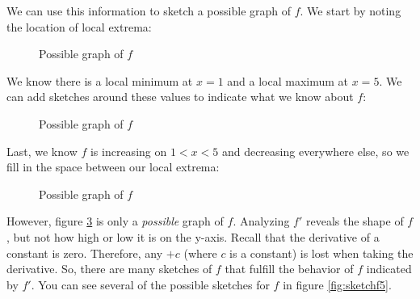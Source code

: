 We can use this information to sketch a possible graph of $f$. We start by noting the location of local extrema:
\begin{figure}[htbp]
	\centering
	\caption{Possible graph of $f$}
	\label{fig:sketchf2}
\end{figure}

We know there is a local minimum at $x=1$ and a local maximum at $x=5$. We can add sketches around these values to indicate what we know about $f$:
\begin{figure}[htbp]
	\centering
	\caption{Possible graph of $f$}
	\label{fig:sketchf3}
\end{figure}

Last, we know $f$ is increasing on $1<x<5$ and decreasing everywhere else, so we fill in the space between our local extrema:
\begin{figure}[htbp]
	\centering
	\caption{Possible graph of $f$}
	\label{fig:sketchf4}
\end{figure}

However, figure \ref{fig:sketchf4} is only a \textit{possible} graph of $f$. Analyzing $f'$ reveals the shape of $f$, but not how high or low it is on the y-axis. Recall that the derivative of a constant is zero. Therefore, any $+c$ (where $c$ is a constant) is lost when taking the derivative. So, there are many sketches of $f$ that fulfill the behavior of $f$ indicated by $f'$. You can see several of the possible sketches for $f$ in figure \ref{fig:sketchf5}. 

